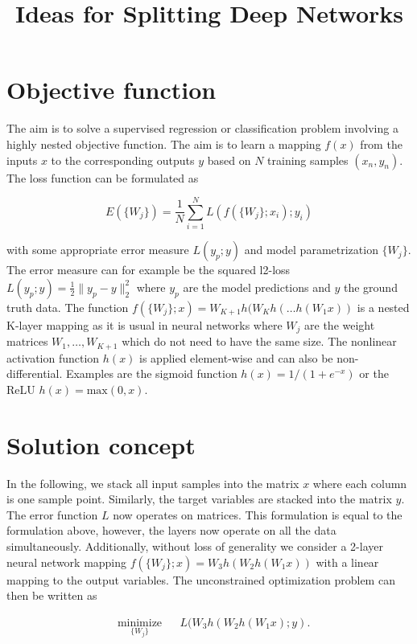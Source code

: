 \documentclass[english,11pt,a4paper]{article}
\title{Ideas for Splitting Deep Networks}
\author{}
\begin{document}
\maketitle


\section{Objective function}

The aim is to solve a supervised regression or classification problem involving a highly nested objective function. The aim is to learn a mapping $f(x)$ from the inputs $x$ to the corresponding outputs $y$ based on $N$ training samples $(x_n, y_n)$. The loss function can be formulated as

\begin{equation}
E(\{W_j\}) = \frac{1}{N} \sum_{i=1}^{N} L(f(\{W_j\};x_i);y_i)
\label{eq:1}
\end{equation}

with some appropriate error measure $L(y_p;y)$ and model parametrization $\{W_j\}$. The error measure can for example be the squared l2-loss $L(y_p;y) = \frac{1}{2} \| y_p - y \|^2_2$ where $y_p$ are the model predictions and $y$ the ground truth data. The function $f(\{W_j\};x) = W_{K+1}h(W_Kh(\dots h(W_1x))$ is a nested K-layer mapping as it is usual in neural networks where $W_j$ are the weight matrices $W_1,\dots,W_{K+1}$ which do not need to have the same size. The nonlinear activation function $h(x)$ is applied element-wise and can also be non-differential. Examples are the sigmoid function $h(x) = 1/(1 + e^{-x})$ or the ReLU $h(x) = \mathrm{max}(0, x)$.

\section{Solution concept}

In the following, we stack all input samples into the matrix $x$ where each column is one sample point. Similarly, the target variables are stacked into the matrix $y$. The error function $L$ now operates on matrices. This formulation is equal to the formulation above, however, the layers now operate on all the data simultaneously. Additionally, without loss of generality we consider a 2-layer neural network mapping $f(\{W_j\};x) = W_3h(W_2h(W_1x))$ with a linear mapping to the output variables. The unconstrained optimization problem can then be written as

\begin{equation}
	\begin{aligned}
		& \underset{\{W_j\}}{\text{minimize}}
		& & L(W_3h(W_2h(W_1x);y).
	\end{aligned}
	\label{eq:loss_function}
\end{equation}
\end{document}
